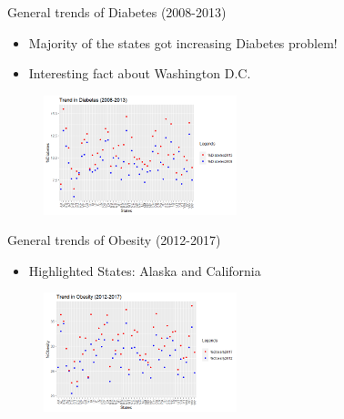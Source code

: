 \documentclass{beamer} %
\begin{document}
\begin{frame}{General trends of Diabetes (2008-2013)}

  \begin{itemize}
    \item Majority of the states got increasing Diabetes problem!
    \item Interesting fact about Washington D.C.
  \end{itemize}
  \begin{figure}
    \includegraphics[width=0.5\textwidth]{DiaTrend.png}
    \hfill
  \end{figure}
\end{frame}


\begin{frame}{General trends of Obesity (2012-2017)}
 \begin{itemize}
  \item Highlighted States: Alaska and California
 \end{itemize}
 \begin{figure}
   \includegraphics[width=0.5\textwidth]{ObesityTrend.png}
   \hfill
 \end{figure}
\end{frame}
\end{document}
